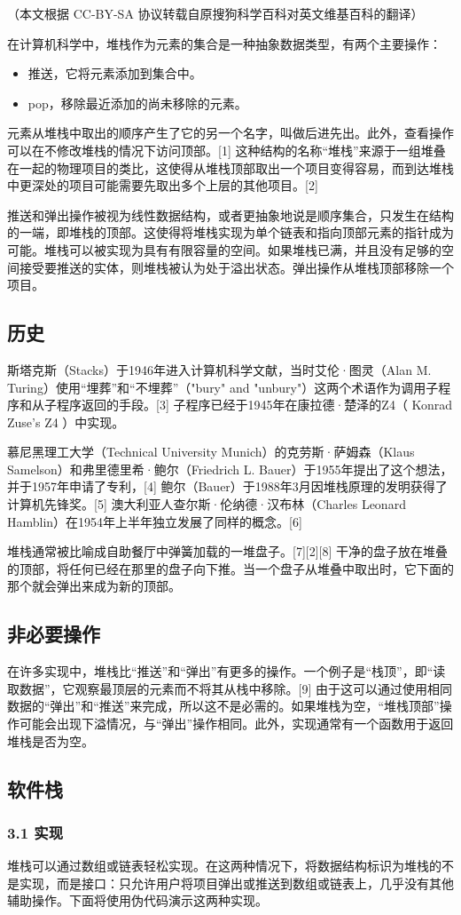 
（本文根据 CC-BY-SA 协议转载自原搜狗科学百科对英文维基百科的翻译）

在计算机科学中，堆栈作为元素的集合是一种抽象数据类型，有两个主要操作：
\begin{itemize}
\item 推送，它将元素添加到集合中。
\item pop，移除最近添加的尚未移除的元素。
\end{itemize}
元素从堆栈中取出的顺序产生了它的另一个名字，叫做后进先出。此外，查看操作可以在不修改堆栈的情况下访问顶部。[1] 这种结构的名称“堆栈”来源于一组堆叠在一起的物理项目的类比，这使得从堆栈顶部取出一个项目变得容易，而到达堆栈中更深处的项目可能需要先取出多个上层的其他项目。[2]

推送和弹出操作被视为线性数据结构，或者更抽象地说是顺序集合，只发生在结构的一端，即堆栈的顶部。这使得将堆栈实现为单个链表和指向顶部元素的指针成为可能。堆栈可以被实现为具有有限容量的空间。如果堆栈已满，并且没有足够的空间接受要推送的实体，则堆栈被认为处于溢出状态。弹出操作从堆栈顶部移除一个项目。

\subsection{历史}
斯塔克斯（Stacks）于1946年进入计算机科学文献，当时艾伦·图灵（Alan M. Turing）使用“埋葬”和“不埋葬”（"bury" and "unbury"）这两个术语作为调用子程序和从子程序返回的手段。[3] 子程序已经于1945年在康拉德·楚泽的Z4（ Konrad Zuse's Z4 ）中实现。

慕尼黑理工大学（Technical University Munich）的克劳斯·萨姆森（Klaus Samelson）和弗里德里希·鲍尔（Friedrich L. Bauer）于1955年提出了这个想法，并于1957年申请了专利，[4] 鲍尔（Bauer）于1988年3月因堆栈原理的发明获得了计算机先锋奖。[5] 澳大利亚人查尔斯·伦纳德·汉布林（Charles Leonard Hamblin）在1954年上半年独立发展了同样的概念。[6]

堆栈通常被比喻成自助餐厅中弹簧加载的一堆盘子。[7][2][8] 干净的盘子放在堆叠的顶部，将任何已经在那里的盘子向下推。当一个盘子从堆叠中取出时，它下面的那个就会弹出来成为新的顶部。

\subsection{ 非必要操作}
在许多实现中，堆栈比“推送”和“弹出”有更多的操作。一个例子是“栈顶”，即“读取数据”，它观察最顶层的元素而不将其从栈中移除。[9] 由于这可以通过使用相同数据的“弹出”和“推送”来完成，所以这不是必需的。如果堆栈为空，“堆栈顶部”操作可能会出现下溢情况，与“弹出”操作相同。此外，实现通常有一个函数用于返回堆栈是否为空。

\subsection{软件栈}
\subsubsection{3.1 实现}
堆栈可以通过数组或链表轻松实现。在这两种情况下，将数据结构标识为堆栈的不是实现，而是接口：只允许用户将项目弹出或推送到数组或链表上，几乎没有其他辅助操作。下面将使用伪代码演示这两种实现。
